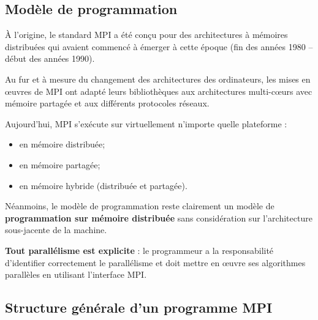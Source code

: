 \documentclass[11pt,a4paper]{article}
\begin{document}
\subsection{Mod\`ele de programmation}

\`A l'origine, le standard MPI a été con\c{c}u pour des architectures \`a m\'emoires distribu\'ees qui avaient commenc\'e \`a \'emerger \`a
cette \'epoque (fin des ann\'ees 1980 -- début des ann\'ees 1990).

Au fur et \`a mesure du changement des architectures des ordinateurs, les mises en {\oe}uvres de MPI ont adapt\'e leurs
biblioth\`eques aux architectures multi-c{\oe}urs avec m\'emoire partag\'ee et aux diff\'erents protocoles r\'eseaux.

Aujourd'hui, MPI s'ex\'ecute sur virtuellement n'importe quelle plateforme :
\begin{itemize}
\item en m\'emoire distribu\'ee;
\item en m\'emoire partag\'ee;
\item en m\'emoire hybride (distribu\'ee et partag\'ee).
\end{itemize}

N\'eanmoins, le mod\`ele de programmation reste clairement un mod\`ele de \textbf{programmation sur m\'emoire distribu\'ee} sans 
consid\'eration sur l'architecture sous-jacente de la machine.

\textbf{Tout parall\'elisme est explicite} : le programmeur a la responsabilité d'identifier correctement le parall\'elisme
et doit mettre en {\oe}uvre ses algorithmes parall\`eles en utilisant l'interface MPI.

\subsection{Structure g\'en\'erale d'un programme MPI}
\end{document}
